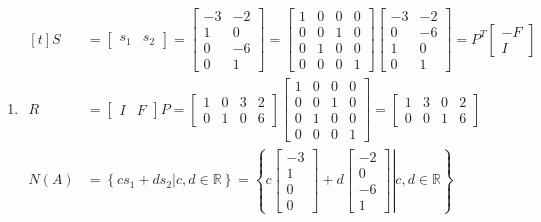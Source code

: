 \documentclass{article}
\begin{document}
\begin{enumerate}
	\item 
		$\begin{aligned}[t]
			S&=\begin{bmatrix}
				s_1 & s_2
			\end{bmatrix}=\begin{bmatrix}
				-3 & -2 \\
				1 & 0 \\
				0 & -6 \\
				0 & 1
			\end{bmatrix}=\begin{bmatrix}
				1 & 0 & 0 & 0 \\
				0 & 0 & 1 & 0 \\
				0 & 1 & 0 & 0 \\
				0 & 0 & 0 & 1
			\end{bmatrix}\begin{bmatrix}
				-3 & -2 \\
				0 & -6 \\
				1 & 0 \\
				0 & 1
			\end{bmatrix}=P^T\begin{bmatrix}
				-F \\ I
			\end{bmatrix} \\
			R&=\begin{bmatrix}
				I & F
			\end{bmatrix}P=\begin{bmatrix}
				1 & 0 & 3 & 2 \\
				0 & 1 & 0 & 6
			\end{bmatrix}\begin{bmatrix}
				1 & 0 & 0 & 0 \\
				0 & 0 & 1 & 0 \\
				0 & 1 & 0 & 0 \\
				0 & 0 & 0 & 1
			\end{bmatrix}=\begin{bmatrix}
				1 & 3 & 0 & 2 \\
				0 & 0 & 1 & 6
			\end{bmatrix} \\
			N(A)&=\left\{\left.cs_1+ds_2\right|c,d\in\mathbb R\right\}
			=\left\{\left.c \begin{bmatrix}
			    -3 \\ 1 \\ 0 \\ 0
			\end{bmatrix}+d \begin{bmatrix}
				-2 \\ 0 \\ -6 \\ 1
			\end{bmatrix}\right|c,d\in\mathbb R\right\}
		\end{aligned}$
	

\end{enumerate}
\end{document}
